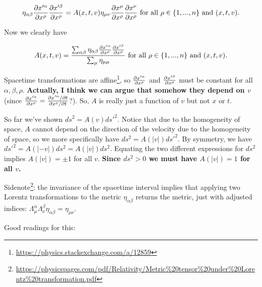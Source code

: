 \documentclass{article}
\begin{document}
\begin{align*}
    \eta_{\alpha \beta} \frac{\partial x'^\alpha}{\partial x^\rho} \frac{\partial x'^\beta}{\partial x^\rho} = A(x, t, v) \eta_{\mu \nu} \frac{\partial x^\mu}{\partial x^\rho} \frac{\partial x^\nu}{\partial x^\rho} \text{ for all $\rho \in \{1, ..., n\}$} \text{ and $(x, t, v)$}.
\end{align*}

Now we clearly have

\begin{align*}
    A(x, t, v) = \frac{\sum_{\alpha \beta} \eta_{\alpha \beta} \frac{\partial x'^\alpha}{\partial x^\rho} \frac{\partial x'^\beta}{\partial x^\rho}}{\sum_\mu \eta_{\mu \mu} } \text{ for all $\rho \in \{1, ..., n\}$} \text{ and $(x, t, v)$}.
\end{align*}

Spacetime transformations are affine\footnote{\url{https://physics.stackexchange.com/a/12859}}, so $\frac{\partial x'^\alpha}{\partial x^\rho}$ and $\frac{\partial x'^\beta}{\partial x^\rho}$ must be constant for all $\alpha, \beta, \rho$. \textbf{Actually, I think we can argue that somehow they depend on $v$} (since $\frac{\partial x'^\alpha}{\partial x^\rho} = \frac{\partial x'^\alpha/\partial t}{\partial x^\rho/\partial t}$?). So, $A$ is really just a function of $v$ but not $x$ or $t$.

So far we've shown $ds^2 = A(v) ds'^2$. Notice that due to the homogeneity of space, $A$ cannot depend on the direction of the velocity due to the homogeneity of space, so we more specifically have $ds^2 = A(|v|) ds'^2$. By symmetry, we have $ds'^2 = A(|-v|) ds^2 = A(|v|) ds^2$. Equating the two different expressions for $ds^2$ implies $A(|v|) = \pm 1$ for all $v$. \textbf{Since $ds^2 > 0$ we must have $A(|v|) = 1$ for all $v$.}


Sidenote\footnote{\url{https://physicspages.com/pdf/Relativity/Metric\%20tensor\%20under\%20Lorentz\%20transformation.pdf}}: the invariance of the spacetime interval implies that applying two Lorentz transformations to the metric $\eta_{\alpha \beta}$ returns the metric, just with adjusted indices: $\Lambda^\alpha_\mu \Lambda^\beta_\nu \eta_{\alpha \beta} = \eta_{\mu \nu}$.



Good readings for this:
\end{document}
